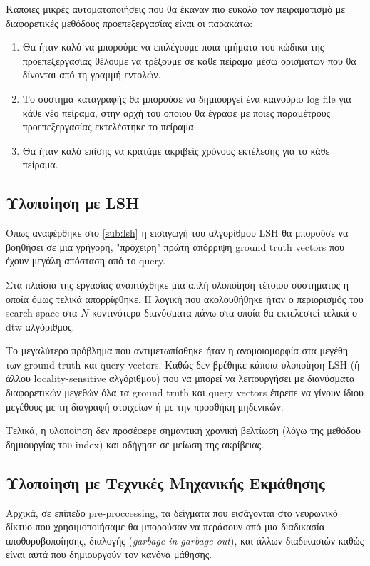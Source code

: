 Κάποιες μικρές αυτοματοποιήσεις που θα έκαναν πιο εύκολο τον πειραματισμό με διαφορετικές μεθόδους προεπεξεργασίας είναι οι παρακάτω:
\begin{enumerate}
	\item Θα ήταν καλό να μπορούμε να επιλέγουμε ποια τμήματα του κώδικα της προεπεξεργασίας θέλουμε να τρέξουμε σε κάθε πείραμα μέσω ορισμάτων που θα δίνονται από τη γραμμή εντολών.
 	\item Το σύστημα καταγραφής θα μπορούσε να δημιουργεί ένα καινούριο log file για κάθε νέο πείραμα, στην αρχή του οποίου θα έγραφε με ποιες παραμέτρους προεπεξεργασίας εκτελέστηκε το πείραμα.
  \item Θα ήταν καλό επίσης να κρατάμε ακριβείς χρόνους εκτέλεσης για το κάθε πείραμα.
\end{enumerate}

\subsection{Υλοποίηση με LSH}
Όπως αναφέρθηκε στο \ref{sub:lsh} η εισαγωγή του αλγορίθμου LSH θα μπορούσε να βοηθήσει σε μια γρήγορη, "πρόχειρη" πρώτη απόρριψη ground truth vectors που έχουν μεγάλη απόσταση από το query.

Στα πλαίσια της εργασίας αναπτύχθηκε μια απλή υλοποίηση τέτοιου συστήματος η οποία όμως τελικά απορρίφθηκε.
Η λογική που ακολουθήθηκε ήταν ο περιορισμός του search space στα $N$ κοντινότερα διανύσματα πάνω στα οποία θα εκτελεστεί τελικά ο dtw αλγόριθμος.

Το μεγαλύτερο πρόβλημα που αντιμετωπίσθηκε ήταν η ανομοιομορφία στα μεγέθη των ground truth και query vectors.
Καθώς δεν βρέθηκε κάποια υλοποίηση LSH (ή άλλου locality-sensitive αλγόριθμου) που να μπορεί να λειτουργήσει με διανύσματα διαφορετικών μεγεθών όλα τα ground truth και query vectors έπρεπε να γίνουν ίδιου μεγέθους με τη διαγραφή στοιχείων ή με την προσθήκη μηδενικών.

Τελικά, η υλοποίηση δεν προσέφερε σημαντική χρονική βελτίωση (λόγω της μεθόδου δημιουργίας του index) και οδήγησε σε μείωση της ακρίβειας.

\subsection{Υλοποίηση με Τεχνικές Μηχανικής Εκμάθησης}
Αρχικά, σε επίπεδο pre-proccessing, τα δείγματα που εισάγονται στο νευρωνικό δίκτυο που χρησιμοποιήσαμε θα μπορούσαν να περάσουν από μια διαδικασία αποθορυβοποίησης, διαλογής (\textit{garbage-in-garbage-out}), και άλλων διαδικασιών καθώς είναι αυτά που δημιουργούν τον κανόνα μάθησης.

